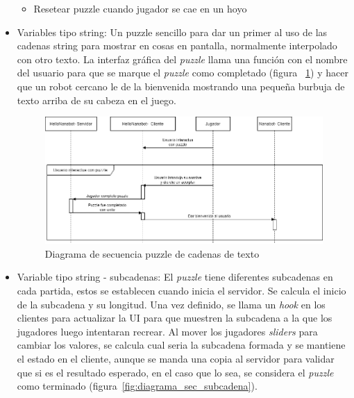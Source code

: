 \begin{itemize}
\begin{itemize}
        \item Resetear puzzle cuando jugador se cae en un hoyo
    \end{itemize}
    \item Variables tipo string: Un puzzle sencillo para dar un primer al uso de las cadenas string para mostrar en cosas en pantalla, normalmente interpolado con otro texto. La interfaz gráfica del \textit{puzzle} llama una función con el nombre del usuario para que se marque el \textit{puzzle} como completado (figura ~\ref{fig:diagrama_sec_string}) y hacer que un robot cercano le de la bienvenida mostrando una pequeña burbuja de texto arriba de su cabeza en el juego.
    \begin{figure}[H]
        \centering
        \includegraphics[width=0.8\linewidth]{images/DiagramaSecuenciaPuzzleString.png}
        \caption{Diagrama de secuencia puzzle de cadenas de texto}
        \label{fig:diagrama_sec_string}
    \end{figure}
    \item Variable tipo string - subcadenas: El \textit{puzzle} tiene diferentes subcadenas en cada partida, estos se establecen cuando inicia el servidor. Se calcula el inicio de la subcadena y su longitud. Una vez definido, se llama un \textit{hook} en los clientes para actualizar la UI para que muestren la subcadena a la que los jugadores luego intentaran recrear. Al mover los jugadores \textit{sliders} para cambiar los valores, se calcula cual seria la subcadena formada y se mantiene el estado en el cliente, aunque se manda una copia al servidor para validar que si es el resultado esperado, en el caso que lo sea, se considera el \textit{puzzle} como terminado (figura~\ref{fig:diagrama_sec_subcadena}).
    \begin{figure}[H]
        \centering

\end{figure}
\end{itemize}
